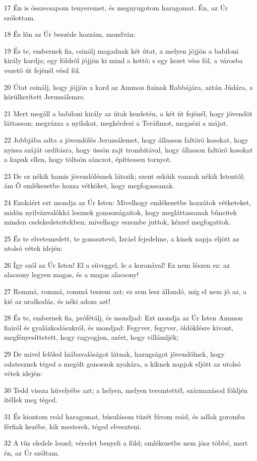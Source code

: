 \par 17 Én is összecsapom tenyeremet, és megnyugotom haragomat.  Én, az Úr szólottam.
\par 18 És lõn az Úr beszéde hozzám, mondván:
\par 19 És te, embernek fia, csinálj magadnak két útat, a melyen jõjjön a babiloni király kardja; egy földrõl jõjjön ki mind a kettõ; s egy kezet véss föl, a városba vezetõ út fejénél vésd föl.
\par 20 Útat csinálj, hogy jõjjön a kard az Ammon fiainak Rabbájára, aztán Júdára, a körülkerített Jeruzsálemre.
\par 21 Mert megáll a babiloni király az útak kezdetén, a két út fejénél, hogy jövendõt láttasson; megrázza a nyilakat, megkérdezi a Teráfimot, megnézi a májat.
\par 22 Jobbjába adta a jövendölés Jeruzsálemet, hogy állasson faltörõ kosokat, hogy nyissa száját ordításra, hogy üssön zajt trombitával, hogy állasson faltörõ kosokat a kapuk ellen, hogy töltsön sánczot, építtessen tornyot.
\par 23 De ez nékik hamis jövendölésnek látszik; szent esküik vannak nékik Istentõl; ám Õ emlékezetbe hozza vétköket, hogy megfogassanak.
\par 24 Ezokáért ezt mondja az Úr Isten: Mivelhogy emlékezetbe hozzátok vétketeket, midõn nyilvánvalókká lesznek gonoszságaitok, hogy megláttassanak bûneitek minden cselekedeteitekben; mivelhogy eszembe juttok, kézzel megfogattok.
\par 25 És te elvetemedett, te gonosztevõ, Izráel fejedelme, a kinek napja eljött az utolsó vétek idején:
\par 26 Így szól az Úr Isten! El a süveggel, le a koronával! Ez nem lészen ez: az alacsony legyen magas, és a magas alacsony!
\par 27 Rommá, rommá, rommá teszem azt; ez sem lesz állandó, míg el nem jõ az, a kié az uralkodás, és néki adom azt!
\par 28 És te, embernek fia, prófétálj, és mondjad: Ezt mondja az Úr Isten Ammon fiairól és gyalázkodásukról, és mondjad: Fegyver, fegyver, öldöklésre kivont, megfényesíttetett, hogy ragyogjon, azért, hogy villámljék;
\par 29 De mivel felõled hiábavalóságot látnak, hazugságot jövendölnek, hogy odatesznek téged a megölt gonoszok nyakára, a kiknek napjok eljött az utolsó vétek idején:
\par 30 Tedd vissza hüvelyébe azt; a helyen, melyen teremtettél, származásod földjén ítéllek meg téged.
\par 31 És kiontom reád haragomat, búsulásom tüzét fúvom reád, és adlak goromba férfiak kezébe, kik mesterek, téged elveszteni.
\par 32 A tûz eledele leszel; véredet benyeli a föld; emlékezetbe nem jösz többé, mert én, az Úr szóltam.

